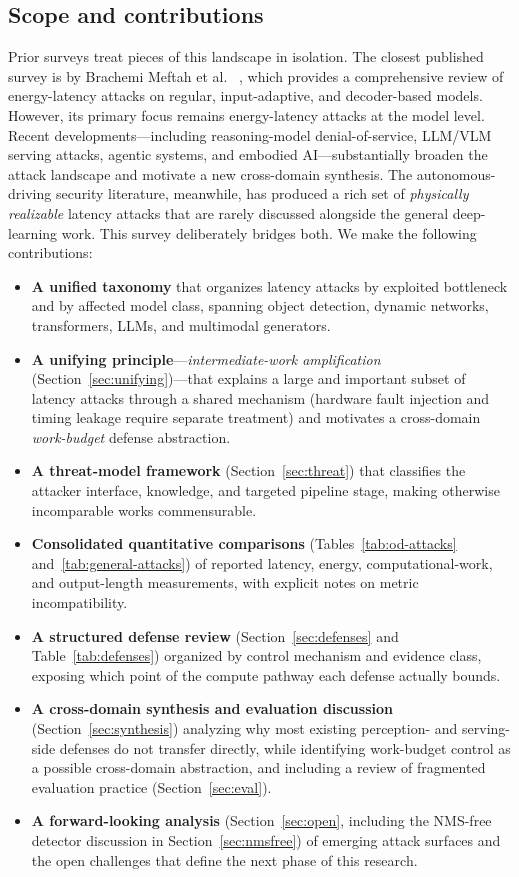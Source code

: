 \documentclass[acmsmall,screen,review,nonacm]{acmart}
\begin{document}
\subsection{Scope and contributions}
Prior surveys treat pieces of this landscape in isolation. The closest published survey is by Brachemi Meftah et al. ~\cite{brachemi2026energy}, which provides a comprehensive review of energy-latency attacks on regular, input-adaptive, and decoder-based models. However, its primary focus remains energy-latency attacks at the model level. Recent developments—including reasoning-model denial-of-service, LLM/VLM serving attacks, agentic systems, and embodied AI—substantially broaden the attack landscape and motivate a new cross-domain synthesis. The autonomous-driving security literature, meanwhile, has produced a rich set of \emph{physically realizable} latency attacks that are rarely discussed alongside the general deep-learning work. This survey deliberately bridges both. We make the following contributions:

\begin{itemize}
  \item \textbf{A unified taxonomy} that organizes latency attacks by exploited bottleneck and by affected model class, spanning object detection, dynamic networks, transformers, LLMs, and multimodal generators.
  \item \textbf{A unifying principle}---\emph{intermediate-work amplification} (Section~\ref{sec:unifying})---that explains a large and important subset of latency attacks through a shared mechanism (hardware fault injection and timing leakage require separate treatment) and motivates a cross-domain \emph{work-budget} defense abstraction.
  \item \textbf{A threat-model framework} (Section~\ref{sec:threat}) that classifies the attacker interface, knowledge, and targeted pipeline stage, making otherwise incomparable works commensurable.
  \item \textbf{Consolidated quantitative comparisons} (Tables~\ref{tab:od-attacks} and~\ref{tab:general-attacks}) of reported latency, energy, computational-work, and output-length measurements, with explicit notes on metric incompatibility.
  \item \textbf{A structured defense review} (Section~\ref{sec:defenses} and Table~\ref{tab:defenses}) organized by control mechanism and evidence class, exposing which point of the compute pathway each defense actually bounds.
  \item \textbf{A cross-domain synthesis and evaluation discussion} (Section~\ref{sec:synthesis}) analyzing why most existing perception- and serving-side defenses do not transfer directly, while identifying work-budget control as a possible cross-domain abstraction, and including a review of fragmented evaluation practice (Section~\ref{sec:eval}).
  \item \textbf{A forward-looking analysis} (Section~\ref{sec:open}, including the NMS-free detector discussion in Section~\ref{sec:nmsfree}) of emerging attack surfaces and the open challenges that define the next phase of this research.
\end{itemize}
\end{document}
